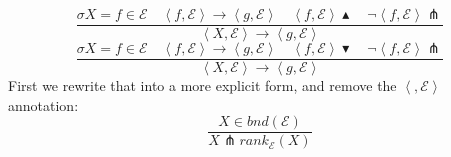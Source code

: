 \begin{equation*}
\frac{\sigma X=f\in \mathcal{E}\quad \left\langle f,\mathcal{E}\right\rangle
\rightarrow \left\langle g,\mathcal{E}\right\rangle \quad \left\langle f,%
\mathcal{E}\right\rangle \blacktriangle \quad \lnot \left\langle f,\mathcal{E%
}\right\rangle \pitchfork }{\left\langle X,\mathcal{E}\right\rangle
\rightarrow \left\langle g,\mathcal{E}\right\rangle }
\end{equation*}%
\begin{equation*}
\frac{\sigma X=f\in \mathcal{E}\quad \left\langle f,\mathcal{E}\right\rangle
\rightarrow \left\langle g,\mathcal{E}\right\rangle \quad \left\langle f,%
\mathcal{E}\right\rangle \blacktriangledown \quad \lnot \left\langle f,%
\mathcal{E}\right\rangle \pitchfork }{\left\langle X,\mathcal{E}%
\right\rangle \rightarrow \left\langle g,\mathcal{E}\right\rangle }
\end{equation*}%
First we rewrite that into a more explicit form, and remove the $%
\left\langle ,\mathcal{E}\right\rangle $ annotation:%
\begin{equation*}
\frac{X\in bnd(\mathcal{E})}{X\pitchfork rank_{\mathcal{E}}(X)}
\end{equation*}

